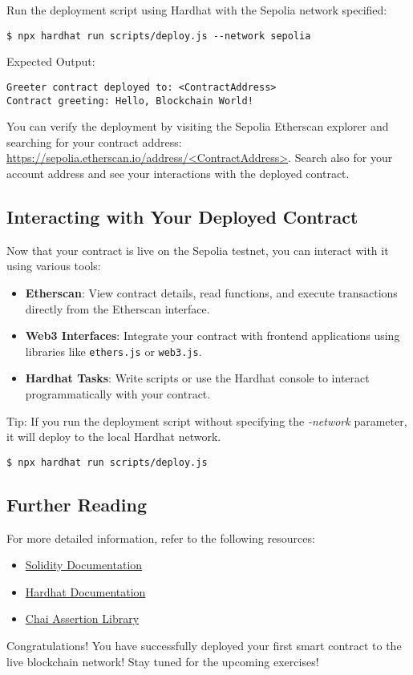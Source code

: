 \documentclass[12pt]{article}
\begin{document}
Run the deployment script using Hardhat with the Sepolia network specified:

\begin{verbatim}
$ npx hardhat run scripts/deploy.js --network sepolia
\end{verbatim}
Expected Output:
\begin{verbatim}
Greeter contract deployed to: <ContractAddress>
Contract greeting: Hello, Blockchain World!
\end{verbatim}
You can verify the deployment by visiting the Sepolia Etherscan explorer and searching for your contract address: \url{https://sepolia.etherscan.io/address/<ContractAddress>}. Search also for your account address and see your interactions with the deployed contract.

\subsection{Interacting with Your Deployed Contract}

Now that your contract is live on the Sepolia testnet, you can interact with it using various tools:

\begin{itemize}
    \item \textbf{Etherscan}: View contract details, read functions, and execute transactions directly from the Etherscan interface.
    
    \item \textbf{Web3 Interfaces}: Integrate your contract with frontend applications using libraries like \texttt{ethers.js} or \texttt{web3.js}.
    
    \item \textbf{Hardhat Tasks}: Write scripts or use the Hardhat console to interact programmatically with your contract.
\end{itemize}
Tip: If you run the deployment script without specifying the \textit{-\-network} parameter, it will deploy to the local Hardhat network.
\begin{verbatim}
$ npx hardhat run scripts/deploy.js
\end{verbatim}

\subsection{Further Reading}

For more detailed information, refer to the following resources:

\begin{itemize}
    \item \href{https://docs.soliditylang.org/en/v0.8.0/}{Solidity Documentation}
    \item \href{https://hardhat.org/docs}{Hardhat Documentation}
    \item \href{https://www.chaijs.com/}{Chai Assertion Library}

\end{itemize}
Congratulations! You have successfully deployed your first smart contract to the live blockchain network! Stay tuned for the upcoming exercises!
\end{document}
